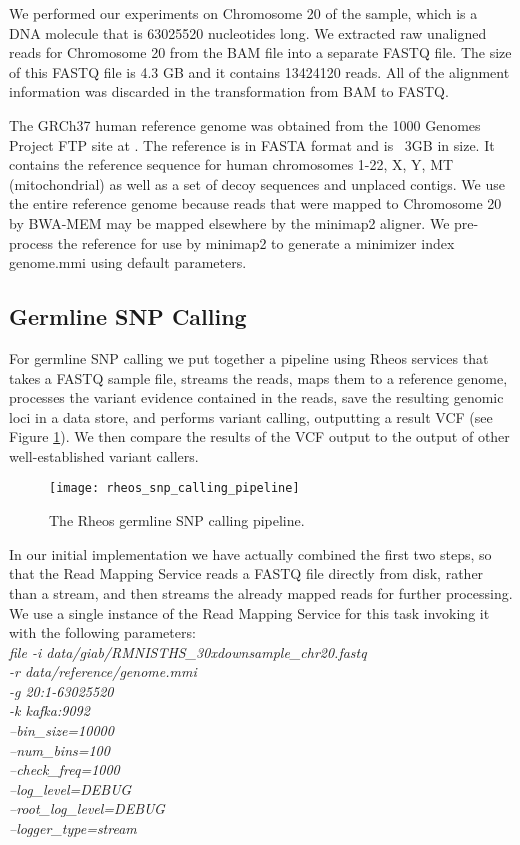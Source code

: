 We performed our experiments on Chromosome 20 of the sample, which is a DNA molecule that is 63025520 nucleotides long. We extracted raw unaligned reads for Chromosome 20 from the BAM file into a separate FASTQ file. The size of this FASTQ file is 4.3 GB and it contains 13424120 reads. All of the alignment information was discarded in the transformation from BAM to FASTQ.

The GRCh37 human reference genome was obtained from the 1000 Genomes Project FTP site at \autocite{1kgp_ftp}. The reference is in FASTA format and is ~3GB in size. It contains the reference sequence for human chromosomes 1-22, X, Y, MT (mitochondrial) as well as a set of decoy sequences and unplaced contigs. We use the entire reference genome because reads that were mapped to Chromosome 20 by BWA-MEM may be mapped elsewhere by the minimap2 aligner. We pre-process the reference for use by minimap2 to generate a minimizer index genome.mmi using default parameters.

\subsection{Germline SNP Calling}

For germline SNP calling we put together a pipeline using Rheos services that takes a FASTQ sample file, streams the reads, maps them to a reference genome, processes the variant evidence contained in the reads, save the resulting genomic loci in a data store, and performs variant calling, outputting a result VCF (see Figure \ref{fig:rheos_snp_calling_pipeline}). We then compare the results of the VCF output to the output of other well-established variant callers.

\begin{figure}[h!]
    \texttt{[image: rheos\_snp\_calling\_pipeline]}
    \centering
    \caption {The Rheos germline SNP calling pipeline.}
    \label{fig:rheos_snp_calling_pipeline}
\end{figure}

In our initial implementation we have actually combined the first two steps, so that the Read Mapping Service reads a FASTQ file directly from disk, rather than a stream, and then streams the already mapped reads for further processing. We use a single instance of the Read Mapping Service for this task invoking it with the following parameters:
\\
\emph{file -i data/giab/RMNISTHS\_30xdownsample\_chr20.fastq \\
-r data/reference/genome.mmi \\
-g 20:1-63025520 \\
-k kafka:9092 \\
--bin\_size=10000 \\
--num\_bins=100 \\
--check\_freq=1000 \\
--log\_level=DEBUG \\
--root\_log\_level=DEBUG \\
--logger\_type=stream\\}


